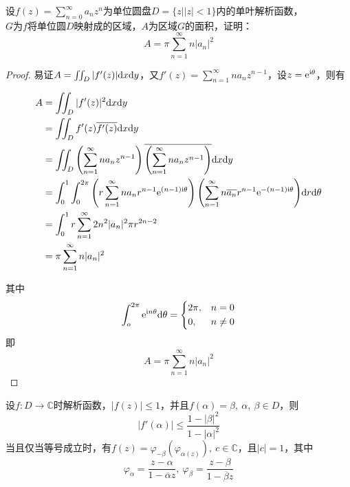 \begin{proposition}
    
    设$f(z) = \sum\limits_{n = 0}^{\infty}{a_nz^n}$为单位圆盘$D = \{z\big| |z| < 1\}$内的单叶解析函数，\\
    $G$为$f$将单位圆$D$映射成的区域，$A$为区域$G$的面积，证明：
    $$A =  \pi\sum\limits_{n = 1}^{\infty}{n|a_n|^2}$$

\end{proposition}

\begin{proof}
    
    易证$A = \iint_{D}{|f'(z)|}\mathrm{d} x\mathrm{d} y$，又$f'(z) = \sum\limits_{n = 1}^{\infty}{na_nz^{n - 1}}$，设$z = \mathrm{e}^{\mathrm{i}\theta}$，则有

    \begin{align*}
        A & = \iint_{D}{|f'(z)|^2}\mathrm{d} x\mathrm{d} y \\ 
          & = \iint_{D}{f'(z)\overline{{f'(z)}}}\mathrm{d} x\mathrm{d} y \\
          & = \iint_{D}{\left(\sum\limits_{n = 1}^{\infty}{na_nz^{n - 1}}\right)\overline{\left(\sum\limits_{n = 1}^{\infty}{na_nz^{n - 1}}\right)}}\mathrm{d} x\mathrm{d} y \\
          & = \int_{0}^{1}{\int_{0}^{2 \pi}{\left(r\sum\limits_{n = 1}^{\infty}{na_nr^{n - 1}\mathrm{e}^{(n - 1)\mathrm{i}\theta}}\right)\left(\sum\limits_{n = 1}^{\infty}{n\overline{a_n}r^{n - 1}\mathrm{e}^{-(n - 1)\mathrm{i}\theta}}\right)}\mathrm{d} r}\mathrm{d} \theta \\
          & = \int_{0}^{1}{r\sum\limits_{n = 1}^{\infty}{2n^2|a_n|^2 \pi r^{2n - 2}}} \\
          & = \pi \sum\limits_{n = 1}^{\infty}{n|a_n|^2}
    \end{align*}

    其中
    $$
    \int_{o}^{2\pi}{\mathrm{e}^{\mathrm{i} n\theta}}\mathrm{d} \theta = 
    \left\{
        \begin{aligned}
            &2\pi, & n = 0\\
            &0, & n \neq 0\\
        \end{aligned}
    \right.
    $$
    即
    $$A = \pi \sum\limits_{n = 1}^{\infty}{n|a_n|^2}$$

\end{proof}

\begin{proposition}

    设$f:D \to \mathbb{C}$时解析函数，$|f(z)| \leq 1$，并且$f(\alpha) = \beta,\ \alpha,\ \beta \in D$，则
    $$|f'(\alpha)| \leq \dfrac{1 - |\beta|^2}{1 - |\alpha|^2}$$
    当且仅当等号成立时，有$f(z) = \varphi_{-\beta}(\varphi_{\alpha(z)}),\ c \in \mathbb{C}$，且$|c| = 1$，其中
    $$\varphi_{\alpha} = \dfrac{z -\alpha}{1 - \overline{\alpha}{z}},\ \varphi_{\beta} = \dfrac{z -\beta}{1 - \overline{\beta}{z}}$$

\end{proposition}


